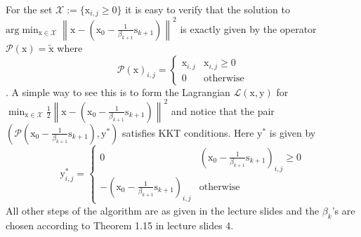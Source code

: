 \documentclass{article}
\newcommand{\0}{\mathrm{0}}
\newcommand{\1}{\mathrm{1}}
\newcommand{\s}{\mathrm{s}}
\newcommand{\x}{\mathrm{x}}
\newcommand{\y}{\mathrm{y}}
\newcommand{\norm}[1]{\left\| #1 \right\|}
\begin{document}
For the set $\mathcal{X} := \{\x_{i,j} \geq 0\}$ it is easy to verify that the solution to $\text{arg}\min_{\x\in\mathcal{X}}\norm{\x - (\x_0 - \frac{1}{\beta_{k+1}}\s_{k+1})}^2$ is exactly given by the operator $\mathcal{P}(\x) = \tilde{\x}$ where
\begin{equation*}
  \mathcal{P}(\x)_{i,j} = \begin{cases}
    \x_{i,j} & \x_{i,j} \geq 0\\
    0 &\text{otherwise}
    \end{cases}
\end{equation*}.
A simple way to see this is to form the Lagrangian $\mathcal{L}(\x,\y)$ for $\min_{\x\in\mathcal{X}}\frac{1}{2}\norm{\x - (\x_0 - \frac{1}{\beta_{k+1}}\s_{k+1})}^2$ and notice that the pair $(\mathcal{P}(\x_0 - \frac{1}{\beta_{k+1}}\s_{k+1}),\y^*)$ satisfies KKT conditions. Here $\y^*$ is given by
\begin{equation*}
  \y^*_{i,j} = \begin{cases}
    0 &  (\x_0 - \frac{1}{\beta_{k+1}}\s_{k+1})_{i,j} \geq 0\\
    -(\x_0 - \frac{1}{\beta_{k+1}}\s_{k+1})_{i,j} &\text{otherwise}
    \end{cases}
\end{equation*}
All other steps of the algorithm are as given in the lecture slides and the $\beta_k$'s are chosen according to Theorem 1.15 in lecture slides 4.
\end{document}
